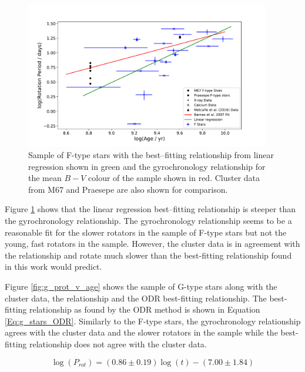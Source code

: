\begin{figure}
    \centering
    \includegraphics[width=0.95\textwidth]{Figures/5-Activity_rotation/f_prot_v_age_LR.pdf}
    \caption{Sample of F-type stars with the best--fitting relationship from linear regression shown in green and the \citet{Barnes_2007} gyrochronology relationship for the mean $B-V$ colour of the sample shown in red. Cluster data from M67 and Praesepe are also shown for comparison.}
    \label{fig:f_prot_v_age}
\end{figure}

Figure \ref{fig:f_prot_v_age} shows that the linear regression best--fitting relationship is steeper than the gyrochronology relationship. The gyrochronology relationship seems to be a reasonable fit for the slower rotators in the sample of F-type stars but not the young, fast rotators in the sample. However, the cluster data is in agreement with the \citet{Barnes_2007} relationship and rotate much slower than the best-fitting relationship found in this work would predict.

Figure \ref{fig:g_prot_v_age} shows the sample of G-type stars along with the cluster data, the \citet{Barnes_2007} relationship and the ODR best-fitting relationship. The best-fitting relationship as found by the ODR method is shown in Equation \ref{Eq:g_stars_ODR}. Similarly to the F-type stars, the gyrochronology relationship agrees with the cluster data and the slower rotators in the sample while the best-fitting relationship does not agree with the cluster data.


\begin{equation}
    \log(P_{rot}) = (0.86 \pm 0.19)\log(t) - (7.00 \pm 1.84)
    \label{Eq:g_stars_ODR}
\end{equation}

